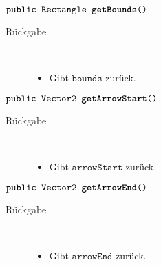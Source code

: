 \begin{description}
		\item $\texttt{public Rectangle \textbf{getBounds}()}$ \\ 
		\begin{description}
			\item[Rückgabe] \hfill \\
			\vspace{-.8cm}
			\begin{itemize}
				\item Gibt $\texttt{bounds}$ zurück.
			\end{itemize}
			\end{description}
			
		\item $\texttt{public Vector2 \textbf{getArrowStart}()}$ \\ 
		\begin{description}
			\item[Rückgabe] \hfill \\
			\vspace{-.8cm}
			\begin{itemize}
				\item Gibt $\texttt{arrowStart}$ zurück.
			\end{itemize}
			\end{description}

		\item $\texttt{public Vector2 \textbf{getArrowEnd}()}$ \\ 
		\begin{description}
			\item[Rückgabe] \hfill \\
			\vspace{-.8cm}
			\begin{itemize}
				\item Gibt $\texttt{arrowEnd}$ zurück.
			\end{itemize}
			\end{description}
			







		
	\end{description}
